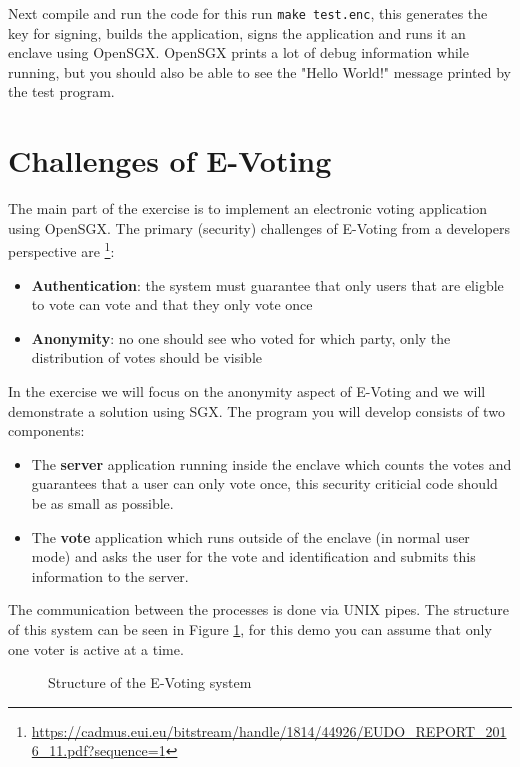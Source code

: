 \documentclass[DIN, pagenumber=false, fontsize=11pt, parskip=half]{scrartcl}
\begin{document}
    Next compile and run the code for this run \texttt{make test.enc}, this generates the key for signing,
    builds the application, signs the application and runs it an enclave using OpenSGX.
    OpenSGX prints a lot of debug information while running, but you should also be able to see the "Hello World!"
    message printed by the test program.

    \section{Challenges of E-Voting}
    The main part of the exercise is to implement an electronic voting application using OpenSGX. 
    The primary (security) challenges of E-Voting from a developers perspective are
    \footnote{\url{https://cadmus.eui.eu/bitstream/handle/1814/44926/EUDO_REPORT_2016_11.pdf?sequence=1}}:
    \begin{itemize}
        \item \textbf{Authentication}: the system must guarantee that only users that are eligble to vote can vote and that they only vote once
        \item \textbf{Anonymity}: no one should see who voted for which party, only the distribution of votes should be visible
    \end{itemize}

    In the exercise we will focus on the anonymity aspect of E-Voting and we will demonstrate a solution using SGX.
    The program you will develop consists of two components:
    \begin{itemize}
        \item The \textbf{server} application running inside the enclave which counts the votes and guarantees 
            that a user can only vote once, this security criticial code should be as small as possible.
        \item The \textbf{vote} application which runs outside of the enclave (in normal user mode) and asks the user 
            for the vote and identification and submits this information to the server.
    \end{itemize}
    The communication between the processes is done via UNIX pipes. The structure
    of this system can be seen in Figure \ref{fig:struct}, for this demo you can
    assume that only one voter is active at a time.
    
    \begin{figure}[h]
        \centering
        \caption{Structure of the E-Voting system}
        \label{fig:struct}
    \end{figure}
\end{document}
